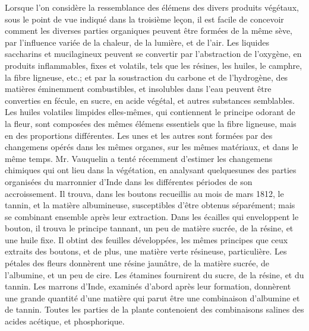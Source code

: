 Lorsque l'on considère la ressemblance des élémens des divers produits végétaux, sous le point de vue indiqué dans la troisième leçon, il est facile de concevoir comment\setcounter{page}{87} les diverses parties organiques peuvent être formées de la même sève, par l’influence variée de la chaleur, de la lumière, et de l’air. Les liquides saccharins et mucilagineux peuvent se convertir par l’abstraction de l’oxygène, en produits inflammables, fixes et volatils, tels que les résines, les huiles, le camphre, la fibre ligneuse, etc.; et par la soustraction du carbone et de l’hydrogène, des matières éminemment combustibles, et insolubles dans l’eau peuvent être converties en fécule, en sucre, en acide végétal, et autres substances semblables. Les huiles volatiles limpides elles-mêmes, qui contiennent le principe odorant de la fleur, sont composées des mêmes élémens essentiels que la fibre ligneuse, mais en des proportions différentes. Les unes et les autres sont formées par des changemens opérés dans les mêmes organes, sur les mêmes matériaux, et dans le même temps.
Mr. Vauquelin a tenté récemment d’estimer les changemens chimiques qui ont lieu dans la végétation, en analysant quelquesunes des parties organisées du marronnier d’Inde dans les différentes périodes de son accroissement. Il trouva, dans les boutons recueillis au mois de mars 1812, le tannin, et la matière albumineuse, susceptibles d’être\setcounter{page}{88} obtenus séparément; mais se combinant ensemble après leur extraction. Dans les écailles qui enveloppent le bouton, il trouva le principe tannant, un peu de matière sucrée, de la résine, et une huile fixe. Il obtint des feuilles développées, les mêmes principes que ceux extraits des boutons, et de plus, une matière verte résineuse, particulière. Les pétales des fleurs donnèrent une résine jaunâtre, de la matière sucrée, de l'albumine, et un peu de cire. Les étamines fournirent du sucre, de la résine, et du tannin.
Les marrons d'Inde, examinés d'abord après leur formation, donnèrent une grande quantité d'une matière qui parut être une combinaison d'albumine et de tannin. Toutes les parties de la plante contenoient des combinaisons salines des acides acétique, et phosphorique.
